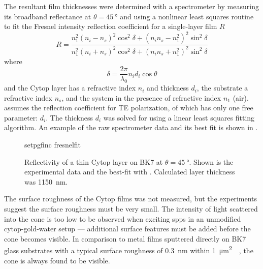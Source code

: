 The resultant film thicknesses were determined with a spectrometer by
measuring its broadband reflectance at $\theta=\SI{45}{\degree}$ and using
a nonlinear least squares routine~\cite{more1977LevAlgImpThe_2} to
fit the Fresnel intensity reflection coefficient for a single-layer
film $R$~\cite{steck2006classical}
\begin{equation}
  R = \frac{n_1^2{(n_i-n_s)}^2 \cos^2\delta + {(n_i n_s - n_1^2)}^2\sin^2\delta}
  {n_1^2{(n_i+n_s)}^2 \cos^2\delta + {(n_i n_s + n_1^2)}^2\sin^2\delta}
  \label{eqn:fitfresnel}
\end{equation}
where
\begin{equation}
  \delta = \frac{2\pi}{\lambda_0} n_i d_i \cos \theta
\end{equation}
and the Cytop layer has a refractive index $n_i$ and thickness $d_i$, the
substrate a refractive index $n_s$, and the system in the presence of
refractive index $n_1$ (air).   assumes the
reflection coefficient for TE polarization, of which 
has only one free parameter: $d_i$.  The thickness $d_i$ was solved for using
a linear least squares fitting algorithm.  An example of the raw spectrometer
data and its best fit is shown in .

\begin{figure}
  \centering
  {setpgfinc}
  {fresnelfit}
  \caption{Reflectivity of a thin Cytop layer on BK7 at
    $\theta=\SI{45}{\degree}$.  Shown is the experimental data and the
    best-fit with .  Calculated layer thickness was \SI{1150}{\nano\meter}.}
  \label{fig:fresnelfit}
\end{figure}

The surface roughness of the Cytop films was not measured, but the experiments
suggest the surface roughness must be very small.  The intensity of light
scattered into the cone is too low to be observed when exciting \glspl{spp} in an
unmodified cytop-gold-water setup --- additional surface features must be
added before the cone becomes visible.  In comparison to metal films sputtered
directly on BK7 glass substrates with a typical surface roughness of
\SI{0.3}{\nano\meter} within
\SI{1}{\micro\meter\squared}~\cite{cheang2011study}~\cite{chiu2011optimizing},
the cone is always found to be visible.
